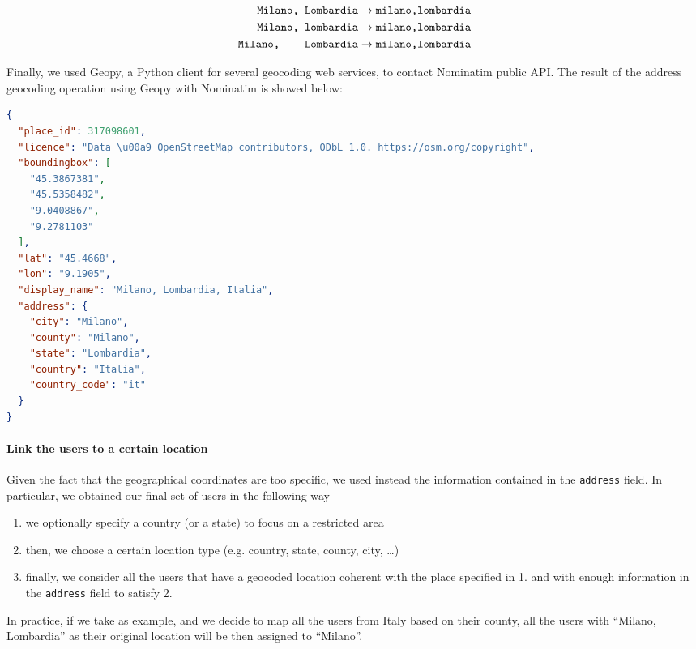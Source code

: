 \begin{align*}
	\texttt{Milano, Lombardia} &\rightarrow \texttt{milano,lombardia} \\
	\texttt{Milano, lombardia} &\rightarrow \texttt{milano,lombardia} \\
	\texttt{Milano, \;\;\;\; Lombardia} &\rightarrow \texttt{milano,lombardia}
\end{align*}

Finally, we used Geopy, a Python client for several geocoding web services, to contact Nominatim public API. The result of the address geocoding operation using Geopy with Nominatim is showed below: 

\begin{lstlisting}[language=json, caption={Json object returned by Geopy given “Milano, Lombardia” as input}, captionpos=b, label={lst:nominatim-geocode}]
{
  "place_id": 317098601, 
  "licence": "Data \u00a9 OpenStreetMap contributors, ODbL 1.0. https://osm.org/copyright",
  "boundingbox": [
    "45.3867381", 
    "45.5358482", 
    "9.0408867", 
    "9.2781103"
  ], 
  "lat": "45.4668", 
  "lon": "9.1905", 
  "display_name": "Milano, Lombardia, Italia",
  "address": {
    "city": "Milano", 
    "county": "Milano",
    "state": "Lombardia", 
    "country": "Italia", 
    "country_code": "it"
  }
}
\end{lstlisting}

\paragraph{Link the users to a certain location}

Given the fact that the geographical coordinates are too specific, we used instead the information contained in the \texttt{address} field. In particular, we obtained our final set of users in the following way

\begin{enumerate}
	\item we optionally specify a country (or a state) to focus on a restricted area
	\item then, we choose a certain location type (e.g. country, state, county, city, \ldots)
	\item finally, we consider all the users that have a geocoded location coherent with the place specified in 1. and with enough information in the \texttt{address} field to satisfy 2.
\end{enumerate}

In practice, if we take  as example, and we decide to map all the users from Italy based on their county, all the users with “Milano, Lombardia” as their original location will be then assigned to “Milano”.
